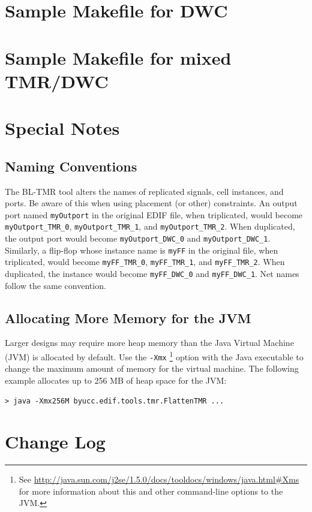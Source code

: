 \documentclass[english]{article}
\numberwithin{figure}{section}
\begin{document}
\section{Sample Makefile for DWC}
\newpage
\section{Sample Makefile for mixed TMR/DWC}



\newpage
\section{Special Notes}

\subsection{Naming Conventions}
\label{naming conventions}
The BL-TMR tool alters the names of replicated signals, cell instances, and 
ports. Be aware of this when using placement (or other) constraints. An output
port named \texttt{myOutport} in the original EDIF file, when triplicated,
would become \texttt{myOutport\_TMR\_0}, \texttt{myOutport\_TMR\_1}, and
\texttt{myOutport\_TMR\_2}. When duplicated, the output port would become
\texttt{myOutport\_DWC\_0} and \texttt{myOutport\_DWC\_1}. Similarly, a
flip-flop whose instance name is \texttt{myFF} in the original file, when
triplicated, would become \texttt{myFF\_TMR\_0}, \texttt{myFF\_TMR\_1}, and
\texttt{myFF\_TMR\_2}. When duplicated, the instance would become
\texttt{myFF\_DWC\_0} and \texttt{myFF\_DWC\_1}. Net names follow the same
convention.

\subsection{Allocating More Memory for the JVM}
Larger designs may require more heap memory than the Java Virtual Machine (JVM) 
is allocated by default. Use the \texttt{-Xmx}
\footnote{See 
\url{http://java.sun.com/j2se/1.5.0/docs/tooldocs/windows/java.html\#Xms} 
for more information about this and other command-line options to the JVM.} 
option with the Java executable to change the maximum amount of memory for 
the virtual machine. The following example allocates up to 256 MB of 
heap space for the JVM:

\begin{verbatim}
> java -Xmx256M byucc.edif.tools.tmr.FlattenTMR ...
\end{verbatim}

\section{Change Log}

{\footnotesize

}
\end{document}
